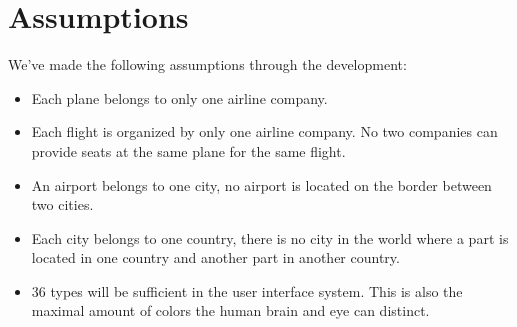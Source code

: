 \section{Assumptions}
We've made the following assumptions through the development:
\begin{itemize}
 \item Each plane belongs to only one airline company.
 \item Each flight is organized by only one airline company. No two companies
can provide seats at the same plane for the same flight.
 \item An airport belongs to one city, no airport is located on the border
between two cities.
 \item Each city belongs to one country, there is no city in the world where a
part is located in one country and another part in another country.
 \item 36 types will be sufficient in the user interface system. This is also
the maximal amount of colors the human brain and eye can distinct.
\end{itemize}